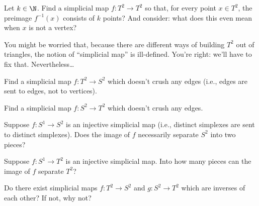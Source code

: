 \documentclass[12pt]{pset}
\begin{document}
\vfill\begin{requiredproblem} Let $k \in \N$.  Find a simplicial map
  $f : T^2 \to T^2$ so that, for every point $x \in T^2$, the preimage
  $f^{-1}(x)$ consists of $k$ points?  And consider: what does this
  even mean when $x$ is not a vertex?
\end{requiredproblem}

\vfill\begin{remark*}
You might be worried that, because there are different ways of
building $T^2$ out of triangles, the notion of ``simplicial map'' is
ill-defined.  You're right: we'll have to fix that.  Nevertheless\ldots
\end{remark*}

\vfill\begin{requiredproblem}
  Find a simplicial map $f : T^2 \to S^2$ which doesn't crush any edges (i.e., edges are sent to edges, not to vertices).
\end{requiredproblem}

\vfill\begin{requiredproblem}
  Find a simplicial map $f : S^2 \to T^2$ which doesn't crush any edges.
\end{requiredproblem}

\vfill\begin{problem}
  Suppose $f : S^1 \to S^2$ is an injective simplicial map (i.e.,
  distinct simplexes are sent to distinct simplexes).  Does the image of
  $f$ necessarily separate $S^2$ into two pieces?
\end{problem}

\vfill\begin{problem}
Suppose $f : S^1 \to T^2$ is an injective simplicial map.  Into how many pieces can the image of $f$ separate $T^2$?
\end{problem}

\vfill\begin{problem} Do there exist simplicial maps $f : T^2 \to S^2$
  and $g : S^2 \to T^2$ which are inverses of each other?  If not, why
  not?
\end{problem}



\end{document}
